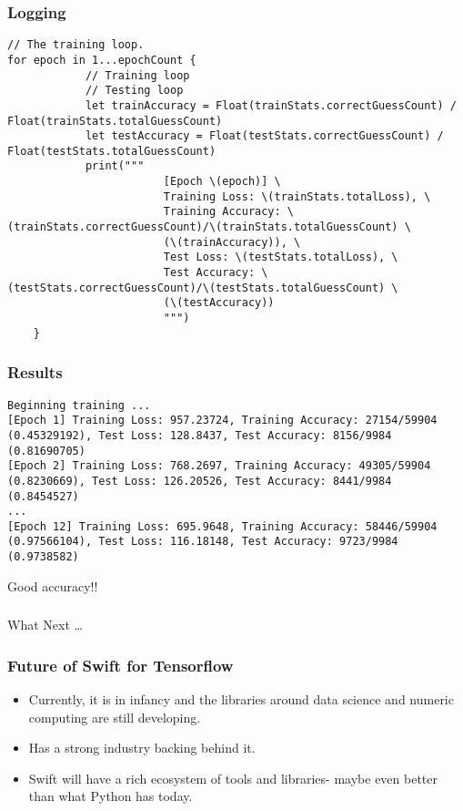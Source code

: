 \begin{frame}[fragile] \frametitle{Logging}

\begin{lstlisting}[basicstyle=\scriptsize]
// The training loop.
for epoch in 1...epochCount {
			// Training loop
			// Testing loop
			let trainAccuracy = Float(trainStats.correctGuessCount) / Float(trainStats.totalGuessCount)
			let testAccuracy = Float(testStats.correctGuessCount) / Float(testStats.totalGuessCount)
			print("""
						[Epoch \(epoch)] \
						Training Loss: \(trainStats.totalLoss), \
						Training Accuracy: \(trainStats.correctGuessCount)/\(trainStats.totalGuessCount) \
						(\(trainAccuracy)), \
						Test Loss: \(testStats.totalLoss), \
						Test Accuracy: \(testStats.correctGuessCount)/\(testStats.totalGuessCount) \
						(\(testAccuracy))
						""")			
    }
\end{lstlisting}

\end{frame}

\begin{frame}[fragile] \frametitle{Results}

\begin{lstlisting}[basicstyle=\scriptsize]
Beginning training ...
[Epoch 1] Training Loss: 957.23724, Training Accuracy: 27154/59904 (0.45329192), Test Loss: 128.8437, Test Accuracy: 8156/9984 (0.81690705) 
[Epoch 2] Training Loss: 768.2697, Training Accuracy: 49305/59904 (0.8230669), Test Loss: 126.20526, Test Accuracy: 8441/9984 (0.8454527) 
...
[Epoch 12] Training Loss: 695.9648, Training Accuracy: 58446/59904 (0.97566104), Test Loss: 116.18148, Test Accuracy: 9723/9984 (0.9738582)
\end{lstlisting}

Good accuracy!!

\end{frame}

\begin{frame}[fragile]\frametitle{}
\begin{center}
{\Large What Next \ldots }
\end{center}
\end{frame}


\begin{frame}[fragile] \frametitle{Future of Swift for Tensorflow}

\begin{itemize}
\item Currently, it is in infancy and the libraries around data science and numeric computing are still developing.
\item Has a strong industry backing behind it.
\item Swift will have a rich ecosystem of tools and libraries- maybe even better than what Python has today.
\end{itemize}

\end{frame}
